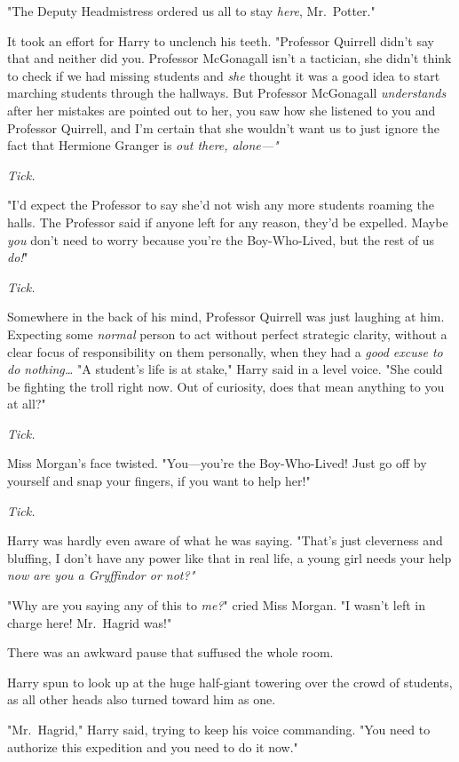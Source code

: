 "The Deputy Headmistress ordered us all to stay \emph{here}, Mr.~Potter."

It took an effort for Harry to unclench his teeth. "Professor Quirrell didn't say that and neither did you. Professor McGonagall isn't a tactician, she didn't think to check if we had missing students and \emph{she} thought it was a good idea to start marching students through the hallways. But Professor McGonagall \emph{understands} after her mistakes are pointed out to her, you saw how she listened to you and Professor Quirrell, and I'm certain that she wouldn't want us to just ignore the fact that Hermione Granger is \emph{out there, alone---"}

\emph{Tick.}

"I'd expect the Professor to say she'd not wish any more students roaming the halls. The Professor said if anyone left for any reason, they'd be expelled. Maybe \emph{you} don't need to worry because you're the Boy-Who-Lived, but the rest of us \emph{do!}"

\emph{Tick.}

Somewhere in the back of his mind, Professor Quirrell was just laughing at him. Expecting some \emph{normal} person to act without perfect strategic clarity, without a clear focus of responsibility on them personally, when they had a \emph{good excuse to do nothing{\ldots}} "A student's life is at stake," Harry said in a level voice. "She could be fighting the troll right now. Out of curiosity, does that mean anything to you at all?"

\emph{Tick.}

Miss Morgan's face twisted. "You---you're the Boy-Who-Lived! Just go off by yourself and snap your fingers, if you want to help her!"

\emph{Tick.}

Harry was hardly even aware of what he was saying. "That's just cleverness and bluffing, I don't have any power like that in real life, a young girl needs your help \emph{now are you a Gryffindor or not?"}

"Why are you saying any of this to \emph{me?}" cried Miss Morgan. "I wasn't left in charge here! Mr.~Hagrid was!"

There was an awkward pause that suffused the whole room.

Harry spun to look up at the huge half-giant towering over the crowd of students, as all other heads also turned toward him as one.

"Mr.~Hagrid," Harry said, trying to keep his voice commanding. "You need to authorize this expedition and you need to do it now."


